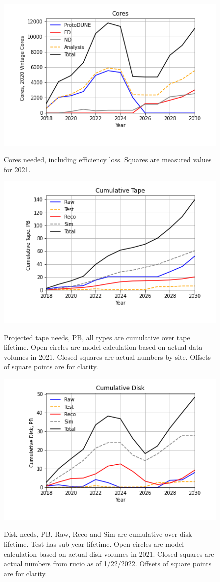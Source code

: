 \documentclass[12pt]{article}
\begin{document}
\begin{figure}
\centering\includegraphics[height=0.4\textwidth]{Cores.png}\label{Cores}
\caption{Cores needed, including efficiency loss. Squares are measured values for 2021.}
\end{figure}
\begin{figure}
\centering\includegraphics[height=0.4\textwidth]{Cumulative-Tape.png}\label{CumulativeTape}
\caption{Projected  tape needs, PB, all types are cumulative over tape lifetime. Open circles are model calculation based on actual data volumes in 2021. Closed squares are actual numbers by site. Offsets of square points are for clarity.}
\end{figure}
\begin{figure}
\centering\includegraphics[height=0.4\textwidth]{Cumulative-Disk}\label{CumulativeDisk}
\caption{Disk needs, PB.  Raw, Reco and Sim are cumulative over disk lifetime.  Test has sub-year lifetime.  Open circles are model calculation based on actual disk volumes in 2021. Closed squares are actual numbers from rucio as of 1/22/2022. Offsets of square points are for clarity.}
\end{figure}
\end{document}
